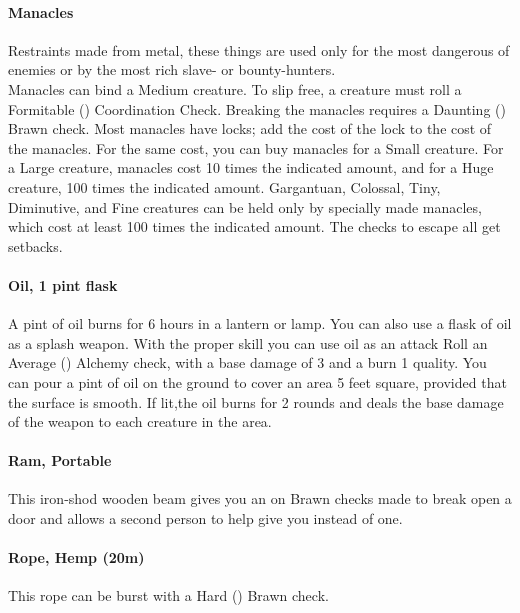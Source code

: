 \begin{multicols}{2}
\paragraph{Manacles} \label{advitm:manacles}
Restraints made from metal, these things are used only for
the most dangerous of enemies or by the most rich slave- or
bounty-hunters.\\
Manacles can bind a Medium creature. To slip free, a
creature must roll a Formitable (\difficulty\difficulty\difficulty\difficulty)
Coordination Check.  Breaking the manacles requires a
Daunting (\difficulty\difficulty\difficulty\difficulty) Brawn check.
Most manacles have locks; add the cost of the lock
to the cost of the manacles.
For the same cost, you can buy manacles for a Small
creature. For a Large creature, manacles cost 10 times
the indicated amount, and for a Huge creature, 100
times the indicated amount. Gargantuan, Colossal, Tiny,
Diminutive, and Fine creatures can be held only by
specially made manacles, which cost at least 100 times
the indicated amount.
The checks to escape all get setbacks.

\paragraph{Oil, 1 pint flask} \label{advitm:oil}
A pint of oil burns for 6 hours in a lantern or lamp.
You can also use a flask of oil as a splash weapon.
With the proper skill you can use oil as an attack
Roll an Average (\difficulty\difficulty) Alchemy check,
with a base damage of 3 and a burn 1 quality. You
can pour a pint of oil on the ground to cover an
area 5 feet square, provided that the surface is
smooth. If lit,the oil burns for 2 rounds and deals
the base damage of the weapon to each creature in
the area.

\paragraph{Ram, Portable} \label{advitm:ram}
This iron-shod wooden beam gives you an \boost on
Brawn checks made to break open a door and
allows a second person to help give you \boost\boost
instead of one.

\paragraph{Rope, Hemp (20m)} \label{advitm:rope_hemp}
This rope can be burst with a Hard (\difficulty\difficulty\difficulty)
Brawn check.


\end{multicols}
